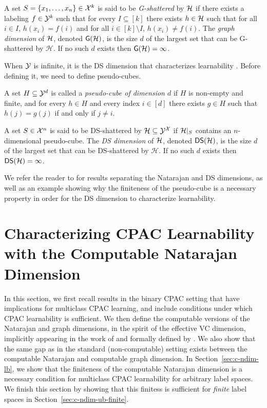 \documentclass[11pt]{article}
\begin{document}
\begin{definition}
    A set $S=\{x_1,\dots,x_n\}\in\mathcal{X}^k$ is said to be \emph{G-shattered} by $\mathcal{H}$ if there exists a labeling $f\in\mathcal{Y}^k$ such that for every $I\subseteq [k]$ there exists $h\in\mathcal{H}$ such that for all $i\in I$, $h(x_i)=f(i)$ and for all $i\in [k]\setminus I$, $h(x_i)\neq f(i)$.
    The \emph{graph dimension} of $\mathcal{H}$, denoted $\mathsf{G}(\mathcal{H})$, is the size $d$ of the largest set that can be G-shattered by $\mathcal{H}$.
    If no such $d$ exists then $\mathsf{G}(\mathcal{H})=\infty$.
\end{definition}

When $\mathcal{Y}$ is infinite, it is the DS dimension that characterizes learnability \citep{daniely2014optimal,brukhim2022characterization}.
Before defining it, we need to define pseudo-cubes.

\begin{definition}
    A set $H\subseteq\mathcal{Y}^d$ is called a \emph{pseudo-cube of dimension $d$} if $H$ is non-empty and finite, and for every $h\in H$ and every index $i\in[d]$ there exists $g\in H$ such that $h(j)=g(j)$ if and only if $j\neq i$. 
\end{definition}

\begin{definition}
    A set $S\in\mathcal{X}^n$ is said to be DS-shattered by $\mathcal{H}\subseteq \mathcal{Y}^{\mathcal{X}}$ if $\mathcal{H}|_S$ contains an $n$-dimensional pseudo-cube. 
    The \emph{DS dimension} of $\mathcal{H}$, denoted $\mathsf{DS}(\mathcal{H})$, is the size $d$ of the largest set that can be DS-shattered by $\mathcal{H}$.
    If no such $d$ exists then $\mathsf{DS}(\mathcal{H})=\infty$.
\end{definition}

We refer the reader to \cite{brukhim2022characterization} for results separating the Natarajan and DS dimensions, as well as an example showing why the finiteness of the pseudo-cube is a necessary property in order for the DS dimension to characterize learnability.

\section{Characterizing CPAC Learnability with the Computable Natarajan Dimension}
\label{sec:c-nat-graph}

In this section, we first recall results in the binary CPAC setting that have implications for multiclass CPAC learning, and include  conditions under which CPAC learnability is sufficient. We then define the computable versions of the Natarajan and graph dimensions, in the spirit of the effective VC dimension, implicitly appearing in the work of \cite{sterkenburg2022characterizations} and formally defined by \cite{delle2023find}.
We also show that the same gap as in the standard (non-computable) setting exists between the computable Natarajan and computable graph dimension. 
In Section~\ref{sec:c-ndim-lb}, we show that the finiteness of the computable Natarajan dimension is a necessary condition for multiclass CPAC learnability for arbitrary label spaces.
We finish this section by showing that this finitess is sufficient for \emph{finite} label spaces in Section~\ref{sec:c-ndim-ub-finite}.
\end{document}
